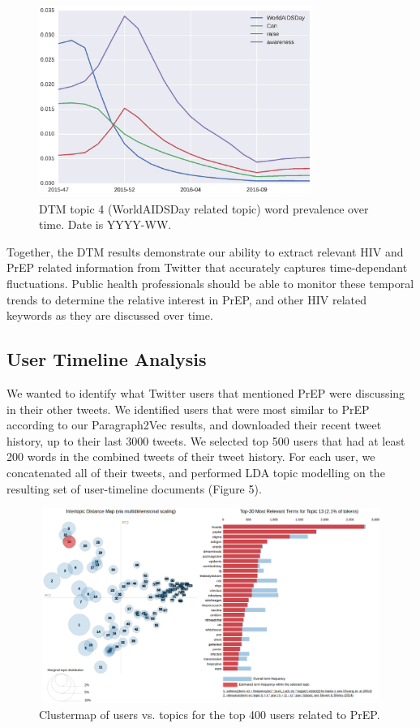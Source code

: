 \documentclass{sig-alternate-05-2015}
\begin{document}
\begin{figure}
\centering
\includegraphics[height=2.5in, width=3.5in]{DTMfig2}
\caption{DTM topic 4 (WorldAIDSDay related topic) word prevalence over time. Date is YYYY-WW.}
\end{figure}

Together, the DTM results demonstrate our ability to extract relevant HIV and PrEP related information from Twitter that accurately captures time-dependant fluctuations. Public health professionals should be able to monitor these temporal trends to determine the relative interest in PrEP, and other HIV related keywords as they are discussed over time.

\subsection{User Timeline Analysis}

We wanted to identify what Twitter users that mentioned PrEP were discussing in their other tweets. We identified users that were most similar to PrEP according to our Paragraph2Vec results, and downloaded their recent tweet history, up to their last 3000 tweets. We selected top 500 users that had at least 200 words in the combined tweets of their tweet history. For each user, we concatenated all of their tweets, and performed LDA topic modelling on the resulting set of user-timeline documents (Figure 5).

\begin{figure}
\centering
\includegraphics[height=2.5in, width=5in]{LDA_user_timelines}
\caption{Clustermap of users vs. topics for the top 400 users related to PrEP.}
\end{figure}
\end{document}
